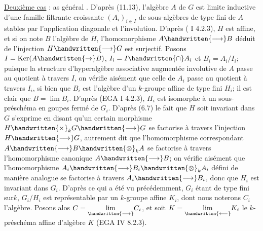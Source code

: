 \uline{Deuxième cas} : as général . D'après (11.13), l'algèbre $A$ de $G$ est limite inductive d'une famille filtrante croissante $(A_i)_{i\in I}$ de sous-algèbres de type fini de $A$ stables par l'application diagonale et l'involution. D'après ( I 4.2.3), $H$ est affine, et si on note $B$ l'algèbre de $H$, l'homomorphisme $A\handwritten{\longrightarrow}B$ déduit de l'injection $H\handwritten{\longrightarrow}G$ est surjectif. Posons $I=\operatorname{Ker}(A\handwritten{\to}B)$, $I_i=I\handwritten{\cap}A_i$ et $B_i=A_i/I_i$; puisque la structure d'hyperalgèbre associative augmentée involutive de $A$ passe au quotient à travers $I$, on vérifie aisément que celle de $A_i$ passe au quotient à travers $I_i$, si bien que $B_i$ est l'algèbre d'un $k$-groupe affine de type fini $H_i$; il est clair que $B=\lim B_i$. D'après (EGA I 4.2.3), $H_i$ est isomorphe à un sous-préschéma en goupes fermé de $G_i$. D'après (6.7) le fait que $H$ soit invariant dans $G$ s'exprime en disant qu'un certain morphisme $H\handwritten{\times}_k G\handwritten{\longrightarrow}G$ se factorise à travers l'injection $H\handwritten{\longrightarrow}G$, autrement dit que l'homomorphisme correspondant $A\handwritten{\longrightarrow}B\handwritten{\otimes}_k A$ se factorise à travers l'homomorphisme canonique $A\handwritten{\longrightarrow}B$; on vérifie aisément que l'homomorphisme $A_i\handwritten{\longrightarrow}B_i\handwritten{\otimes}_k A_i$ défini de manière analogue se factorise à travers $A_i\handwritten{\longrightarrow}B_i$, donc que $H_i$ est invariant dans $G_i$. D'après ce qui a été vu précédemment, $G_i$ étant de type fini sur$k$, $G_i/H_i$ est représentable par un $k$-groupe affine $K_i$, dont nous noterons $C_i$ l'algèbre. Posons alos $C=\underset{\handwritten{\longrightarrow}}{\lim}C_i$, et soit $K=\underset{\handwritten{\longleftarrow}}{\lim}K_i$ le $k$-préschéma affine d'algèbre $K$ (EGA IV 8.2.3).


